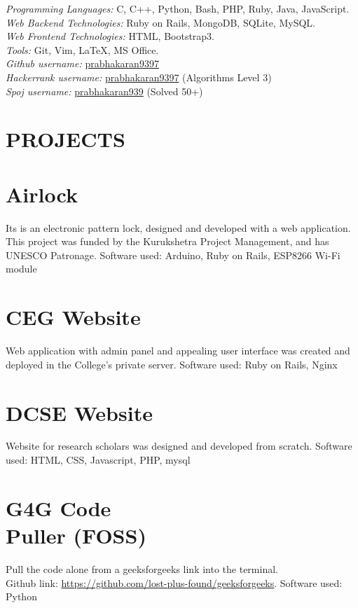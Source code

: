 \documentclass[margin, 10pt]{res} %
\begin{document}
\begin{resume}
{\sl Programming Languages:} C, C++, Python, Bash, PHP, Ruby, Java, JavaScript. \\
{\sl Web Backend Technologies:} Ruby on Rails, MongoDB, SQLite, MySQL. \\
{\sl Web Frontend Technologies:} HTML, Bootstrap3. \\
{\sl Tools:} Git, Vim, LaTeX, MS Office. \\
{\sl Github username:} \href{https://github.com/prabhakaran9397}{prabhakaran9397} \\
{\sl Hackerrank username:} \href{https://www.hackerrank.com/prabhakaran9397}{prabhakaran9397} (Algorithms Level 3) \\
{\sl Spoj username:} \href{http://www.spoj.com/users/prabhakaran939/}{prabhakaran939} (Solved 50+) 

 
\section{PROJECTS}
\section{ \hspace{10pt} Airlock}
Its is an electronic pattern lock, designed and developed with a web application. This project was funded by the Kurukshetra Project Management, and has UNESCO Patronage. Software used: Arduino, Ruby on Rails, ESP8266 Wi-Fi module
\section{ \hspace{05pt} CEG Website}
Web application with admin panel and appealing user interface was created and deployed in the College's private server. Software used: Ruby on Rails, Nginx
\section{ \hspace{05pt} DCSE Website}
Website for research scholars was designed and developed from scratch. Software used: HTML, CSS, Javascript, PHP, mysql
\section{ \hspace{05pt} G4G Code\\ \hspace{05pt} Puller (FOSS)}
Pull the code alone from a geeksforgeeks link into the terminal.\\Github link: \href{https://github.com/lost-plus-found/geeksforgeeks}{https://github.com/lost-plus-found/geeksforgeeks}. Software used: Python

\end{resume}
\end{document}
